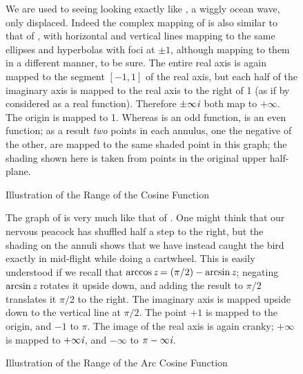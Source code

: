 \begin{figure}
\caption{Illustration of the Range of the Cosine Function}
\small\noindent
We are used to seeing  looking exactly like , a wiggly ocean wave,
only displaced.  Indeed the complex mapping of  is also similar
to that of , with horizontal and vertical lines mapping to the same ellipses
and hyperbolas with foci at $\pm 1$, although mapping to them in a different
manner, to be sure.
The entire real axis is again mapped to the segment $[-1, 1]$ of the real axis,
but each half of the imaginary axis is mapped to the real axis to the right of 1
(as if by  considered as a real function).  Therefore $\pm\infty \emph{i}$
both map to $+\infty$.
The origin is mapped to 1.  Whereas  is an odd function,  is an
even function; as a result \emph{two} points in each annulus, one the negative
of the other, are mapped to the same shaded point in this graph; the shading shown here
is taken from points in the original upper half-plane.
\end{figure}

\clearpage

\begin{figure}
\caption{Illustration of the Range of the Arc Cosine Function}
\small\noindent
The graph of  is very much like that of .
One might think that our nervous peacock has shuffled half a step
to the right, but the shading on the annuli shows that we have instead caught
the bird exactly in mid-flight while doing a cartwheel.
This is easily understood if we recall that $\arccos \emph{z}=(\pi/2)-\arcsin \emph{z}$;
negating $\arcsin \emph{z}$ rotates it upside down, and adding the result to $\pi/2$
translates it $\pi/2$ to the right.
The imaginary axis is mapped upside down to the vertical line at $\pi/2$.
The point $+1$ is mapped to the origin, and $-1$ to $\pi$.
The image of the real axis is again cranky; $+\infty$ is mapped to $+\infty \emph{i}$,
and $-\infty$ to $\pi-\infty \emph{i}$.
\end{figure}

\clearpage

